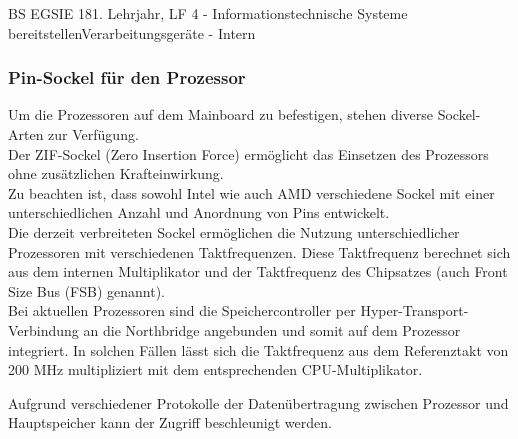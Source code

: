\documentclass[oneside,openany,headings=optiontotoc,11pt,numbers=noenddot]{article}
\begin{document}
\begin{worksheet}{BS EGSIE 18}{1. Lehrjahr, LF 4 - Informationstechnische Systeme bereitstellen}{Verarbeitungsgeräte - Intern}
		\subsubsection*{Pin-Sockel für den Prozessor}
		Um die Prozessoren auf dem Mainboard zu befestigen, stehen diverse Sockel-Arten zur Verfügung.\\
		Der ZIF-Sockel (Zero Insertion Force) ermöglicht das Einsetzen des Prozessors ohne zusätzlichen Krafteinwirkung.\\
		\footnotesize{Zu beachten ist, dass sowohl Intel wie auch AMD verschiedene Sockel mit einer unterschiedlichen Anzahl und Anordnung von Pins entwickelt.}\normalsize\\
		Die derzeit verbreiteten Sockel ermöglichen die Nutzung unterschiedlicher Prozessoren mit verschiedenen Taktfrequenzen. Diese Taktfrequenz berechnet sich aus dem internen Multiplikator und der Taktfrequenz des Chipsatzes (auch Front Size Bus (FSB) genannt).\\
		Bei aktuellen Prozessoren sind die Speichercontroller per Hyper-Transport-Verbindung an die Northbridge angebunden und somit auf dem Prozessor integriert. In solchen Fällen lässt sich die Taktfrequenz aus dem Referenztakt von 200 MHz multipliziert mit dem entsprechenden CPU-Multiplikator.
		\par\noindent
		Aufgrund verschiedener Protokolle der Datenübertragung zwischen Prozessor und Hauptspeicher kann der Zugriff beschleunigt werden.

\end{worksheet}
\end{document}
